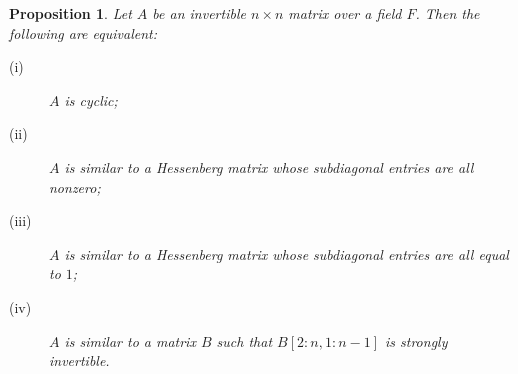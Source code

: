 \documentclass{article}%
\newtheorem{proposition}[theorem]{Proposition}
\begin{document}
\begin{proposition}
Let $A$ be an invertible $n\times n$ matrix over a field $F$. Then the
following are equivalent:

\begin{description}
\item[(i)] $A$ is cyclic;

\item[(ii)] $A$ is similar to a Hessenberg matrix whose subdiagonal entries
are all nonzero;

\item[(iii)] $A$ is similar to a Hessenberg matrix whose subdiagonal entries
are all equal to $1$;

\item[(iv)] $A$ is similar to a matrix $B$ such that $B[2:n,1:n-1]$ is
strongly invertible.
\end{description}
\end{proposition}
\end{document}

